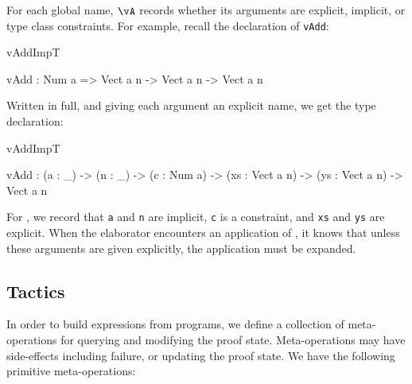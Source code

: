 For each global name, $\vA$ records whether its arguments are explicit, implicit,
or type class constraints.  For example, recall the declaration
of \texttt{vAdd}:

\begin{SaveVerbatim}{vAddImpT}

vAdd : Num a => Vect a n -> Vect a n -> Vect a n

\end{SaveVerbatim}

\noindent
Written in full, and giving each argument an explicit name, we get the
type declaration:

\begin{SaveVerbatim}{vAddImpT}

vAdd : (a : _) -> (n : _) -> (c : Num a) -> 
       (xs : Vect a n) -> (ys : Vect a n) -> Vect a n

\end{SaveVerbatim}

\noindent
For , we record that \texttt{a} and \texttt{n} are implicit, 
\texttt{c} is a constraint, and \texttt{xs} and \texttt{ys} are explicit. When
the elaborator encounters an application of , it knows that unless these arguments
are given explicitly, the application must be expanded.

\newcommand{\Check}{\MO{Check}_\Gamma}
\newcommand{\Eval}{\MO{Normalise}_\Gamma}
\newcommand{\Unify}{\MO{Unify}_\Gamma}

\subsection{Tactics}

In order to build \TT{} expressions from \Idris{} programs, we define a collection
of meta-operations for querying and modifying the proof state. Meta-operations
may have side-effects including failure, or updating the proof state. We have the following
primitive meta-operations:

